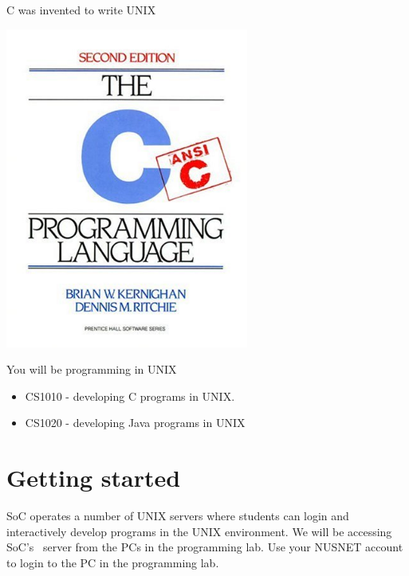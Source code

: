 \begin{frame}{C was invented to write UNIX}
\begin{center}
\includegraphics[width=0.6\textwidth]{c}
\end{center}
\end{frame}

\begin{frame}{You will be programming in UNIX}


\begin{itemize}
\item CS1010 - developing C programs in UNIX.  
\item CS1020 - developing Java programs in UNIX
\end{itemize}
\end{frame}

\section{Getting started} %
SoC operates a number of UNIX servers where students can login and interactively
develop programs in the UNIX environment.  We will be accessing SoC's \sunfire\
server from the PCs in the programming lab.  Use your NUSNET account to login to
the PC in the programming lab.  


